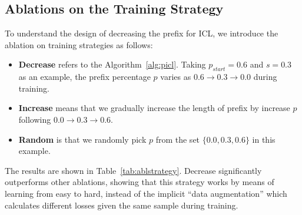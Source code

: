 
	


\subsection{Ablations on the Training Strategy}

To understand the design of decreasing the prefix for ICL, we introduce the ablation on training strategies as follows:
\begin{itemize}
	\item \textbf{Decrease} refers to the Algorithm~\ref{alg:picl}. Taking $p_{start}=0.6$ and $s=0.3$ as an example, the prefix percentage $p$ varies as $0.6\rightarrow 0.3\rightarrow 0.0$ during training.
	\item \textbf{Increase} means that we gradually increase the length of prefix by increase $p$ following $0.0\rightarrow0.3\rightarrow0.6$.
	\item \textbf{Random} is that we randomly pick $p$ from the set $\{0.0, 0.3, 0.6\}$ in this example.
\end{itemize}

The results are shown in Table~\ref{tab:ablstrategy}. Decrease significantly outperforms other ablations, showing that this strategy works by means of learning from easy to hard, instead of the implicit ``data augmentation'' which calculates different losses given the same sample during training.

